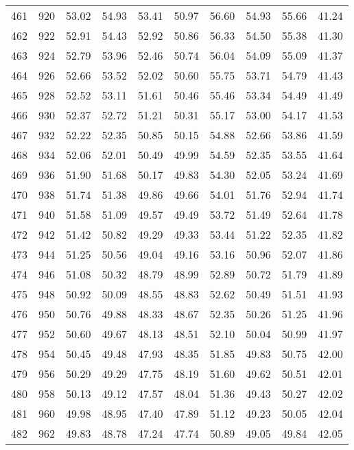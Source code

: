 \begin{longtable}{rrllllllll}
		461 & 920 & 53.02 & 54.93 & 53.41 & 50.97 & 56.60 & 54.93 & 55.66 & 41.24 \\ 
		462 & 922 & 52.91 & 54.43 & 52.92 & 50.86 & 56.33 & 54.50 & 55.38 & 41.30 \\ 
		463 & 924 & 52.79 & 53.96 & 52.46 & 50.74 & 56.04 & 54.09 & 55.09 & 41.37 \\ 
		464 & 926 & 52.66 & 53.52 & 52.02 & 50.60 & 55.75 & 53.71 & 54.79 & 41.43 \\ 
		465 & 928 & 52.52 & 53.11 & 51.61 & 50.46 & 55.46 & 53.34 & 54.49 & 41.49 \\ 
		466 & 930 & 52.37 & 52.72 & 51.21 & 50.31 & 55.17 & 53.00 & 54.17 & 41.53 \\ 
		467 & 932 & 52.22 & 52.35 & 50.85 & 50.15 & 54.88 & 52.66 & 53.86 & 41.59 \\ 
		468 & 934 & 52.06 & 52.01 & 50.49 & 49.99 & 54.59 & 52.35 & 53.55 & 41.64 \\ 
		469 & 936 & 51.90 & 51.68 & 50.17 & 49.83 & 54.30 & 52.05 & 53.24 & 41.69 \\ 
		470 & 938 & 51.74 & 51.38 & 49.86 & 49.66 & 54.01 & 51.76 & 52.94 & 41.74 \\ 
		471 & 940 & 51.58 & 51.09 & 49.57 & 49.49 & 53.72 & 51.49 & 52.64 & 41.78 \\ 
		472 & 942 & 51.42 & 50.82 & 49.29 & 49.33 & 53.44 & 51.22 & 52.35 & 41.82 \\ 
		473 & 944 & 51.25 & 50.56 & 49.04 & 49.16 & 53.16 & 50.96 & 52.07 & 41.86 \\ 
		474 & 946 & 51.08 & 50.32 & 48.79 & 48.99 & 52.89 & 50.72 & 51.79 & 41.89 \\ 
		475 & 948 & 50.92 & 50.09 & 48.55 & 48.83 & 52.62 & 50.49 & 51.51 & 41.93 \\ 
		476 & 950 & 50.76 & 49.88 & 48.33 & 48.67 & 52.35 & 50.26 & 51.25 & 41.96 \\ 
		477 & 952 & 50.60 & 49.67 & 48.13 & 48.51 & 52.10 & 50.04 & 50.99 & 41.97 \\ 
		478 & 954 & 50.45 & 49.48 & 47.93 & 48.35 & 51.85 & 49.83 & 50.75 & 42.00 \\ 
		479 & 956 & 50.29 & 49.29 & 47.75 & 48.19 & 51.60 & 49.62 & 50.51 & 42.01 \\ 
		480 & 958 & 50.13 & 49.12 & 47.57 & 48.04 & 51.36 & 49.43 & 50.27 & 42.02 \\ 
		481 & 960 & 49.98 & 48.95 & 47.40 & 47.89 & 51.12 & 49.23 & 50.05 & 42.04 \\ 
		482 & 962 & 49.83 & 48.78 & 47.24 & 47.74 & 50.89 & 49.05 & 49.84 & 42.05 \\ 

\end{longtable}
